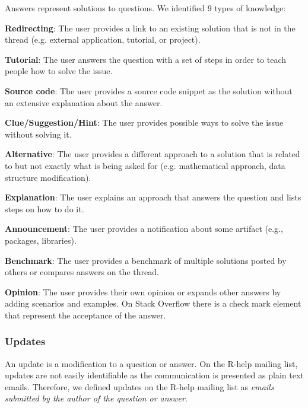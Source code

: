     Answers represent solutions to questions.
    We identified 9 types of knowledge:
    \begin{packed_enum}
    \item \textbf{Redirecting}: The user provides a link to an existing solution that is not in the thread (e.g. external application, tutorial, or project).
    \item \textbf{Tutorial}: The user answers the question with a set of steps in order to teach people how to solve the issue.
    \item \textbf{Source code}: The user provides a source code snippet as the solution without an extensive explanation about the answer.
    \item \textbf{Clue/Suggestion/Hint}: The user provides possible ways to solve the issue without solving it.
    \item \textbf{Alternative}: The user provides a different approach to a solution that is related to but not exactly what is being asked for (e.g. mathematical approach, data structure modification).
    \item \textbf{Explanation}: The user explains an approach that answers the question and lists steps on how to do it.
    \item \textbf{Announcement}: The user provides a notification about some artifact (e.g., packages, libraries).
    \item \textbf{Benchmark}: The user provides a benchmark of multiple solutions posted by others or compares answers on the thread.
    \item \textbf{Opinion}: The user provides their own opinion or expands other answers by adding scenarios and examples.
    On Stack Overflow there is a check mark element that represent the acceptance of the answer.
    \end{packed_enum}

\subsubsection{Updates}

    An update is a modification to a question or answer.
    On the R-help mailing list, updates are not easily identifiable as the communication is presented as plain text emails.
    Therefore, we defined updates on the R-help mailing list as \emph{emails submitted by the author of the question or answer}.

